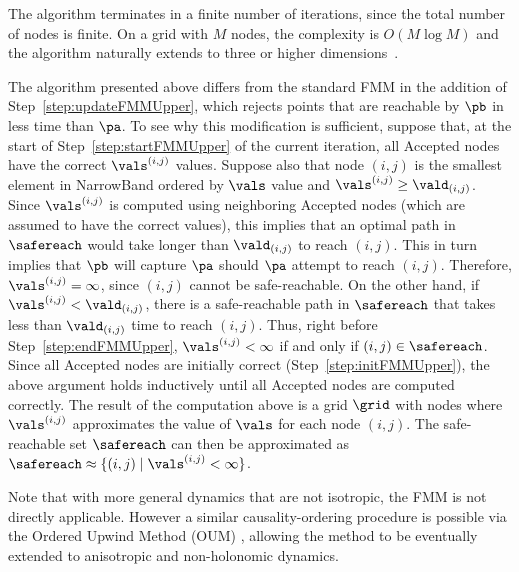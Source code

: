 The algorithm terminates in a finite number of iterations, since the total number of nodes is finite.
On a grid with $M$ nodes, the complexity is $O(M\log M)$ and the algorithm naturally extends to three or higher dimensions~\cite{SethianBook}.

The algorithm presented above differs from the standard FMM in the addition of Step~\ref{step:updateFMMUpper}, which rejects points that are reachable by $\pb$ in less time than $\pa$. 
To see why this modification is sufficient, suppose that, at the start of Step~\ref{step:startFMMUpper} of the current iteration, all Accepted nodes have the correct $\vals^{(i,j)}$ values.
Suppose also that node $(i,j)$ is the smallest element in NarrowBand ordered by $\vals$ value and $\vals^{(i,j)}\ge \vald_{(i,j)}$.
Since $\vals^{(i,j)}$ is computed using neighboring Accepted nodes (which are assumed to have the correct values), this implies that an optimal path in $\safereach$ would take longer than $\vald_{(i,j)}$ to reach $(i,j)$. 
This in turn implies that $\pb$ will capture $\pa$ should $\pa$ attempt to reach $(i,j)$.
Therefore, $\vals^{(i,j)} = \infty$, since $(i,j)$ cannot be safe-reachable.
On the other hand, if $\vals^{(i,j)}< \vald_{(i,j)}$, there is a safe-reachable path in $\safereach$ that takes less than $\vald_{(i,j)}$ time to reach $(i,j)$.
Thus, right before Step~\ref{step:endFMMUpper}, $\vals^{(i,j)}<\infty$ if and only if $(i,j)\in\safereach$.
Since all Accepted nodes are initially correct (Step~\ref{step:initFMMUpper}), the above argument holds inductively until all Accepted nodes are computed correctly.
The result of the computation above is a grid $\grid$ with nodes where $\vals^{(i,j)}$ approximates the value of $\vals$ for each node $(i,j)$.
The safe-reachable set $\safereach$ can then be approximated as $\safereach \approx \{(i,j) \mid \vals^{(i,j)} < \infty \}$.


\begin{rem}
Note that with more general dynamics that are not isotropic, the FMM is not directly applicable.
However a similar causality-ordering procedure is possible via the Ordered Upwind Method (OUM) \cite{SethianOUM}, allowing the method to be eventually extended to anisotropic \cite{SethianOUM} and non-holonomic \cite{TakeiACC} dynamics.
\end{rem}


